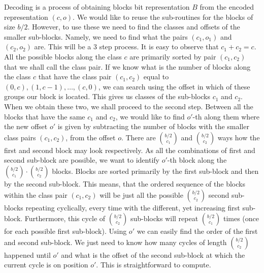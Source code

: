 Decoding is a process of obtaining blocks bit representation $B$ from the encoded
representation $(c, o)$. We would like to reuse the sub-routines for the blocks
of size $b/2$. However, to use these we need to find the classes and offsets of
the smaller sub-blocks. Namely, we need to find what the pairs $(c_1, o_1)$ and
$(c_2, o_2)$ are. This will be a 3 step process. It is easy to observe that $c_1 + c_2 = c$.
All the possible blocks along the class $c$ are primarily sorted by pair $(c_1, c_2)$
that we shall call the class pair. If we know what is the number of blocks along the class $c$
that have the class pair $(c_1, c_2)$ equal to $(0, c), (1, c-1), \ldots , (c, 0)$, we can search
using the offset in which of these groups our block is located. This gives us classes of the sub-blocks
$c_1$ and $c_2$. When we obtain these two, we shall proceed to the second step. Between all the blocks
that have the same $c_1$ and $c_2$, we would like to find $o'$-th along them where the new offset $o'$
is given by subtracting the number of blocks with the smaller class pairs $(c_1, c_2)$, from the offset
$o$. There are ${b/2 \choose c_1}$ and ${b/2 \choose c_2}$ ways how the first and second block may look
respectively. As all the combinations of first and second sub-block are possible, we want to identify
$o'$-th block along the ${b/2 \choose c_1}\cdot {b/2 \choose c_2}$ blocks. Blocks are sorted primarily
by the first sub-block and then by the second sub-block. This means, that the ordered sequence of
the blocks within the class pair $(c_1, c_2)$ will be just all the possible ${b/2 \choose c_2}$
second sub-blocks repeating cyclically, every time with the different, yet increasing
first sub-block. Furthermore, this cycle of ${b/2 \choose c_2}$ sub-blocks will repeat
${b/2 \choose c_1}$ times (once for each possible first sub-block). Using $o'$ we can easily
find the order of the first and second sub-block. We just need to know how many cycles of length
${b/2 \choose c_2}$ happened until $o'$ and what is the offset of the second sub-block at which
the current cycle is on position $o'$. This is straightforward to compute.


